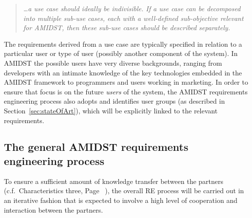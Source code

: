 \begin{quote}
\emph{  \ldots a use case should ideally be indivisible. If a use case can be decomposed into multiple
  sub-use cases, each with a well-defined sub-objective relevant for AMIDST, then these sub-use cases should be
  described separately.}
\end{quote}

The requirements derived from a use case are typically specified in relation to a particular user or type of user (possibly 
another
component of the system). In AMIDST the possible users have very diverse backgrounds, ranging from developers with an
intimate knowledge of the key technologies embedded in the AMIDST framework to programmers and users working in
marketing. In order to ensure that focus is on the future \emph{users} of the system, the AMIDST requirements
engineering process also adopts and identifies user groups (as described in Section~\ref{sec:stateOfArt}), which will be
explicitly linked to the relevant requirements.
%
%
%

\subsection{The general AMIDST requirements engineering process}
\label{sec:reprocess}

To ensure a sufficient amount of knowledge transfer between the partners (c.f.\ Characteristics three, Page~
\pageref{sec:characteristic3}),
the overall  RE process will be carried out in an iterative fashion that is expected to involve a
high level of cooperation and interaction between the partners.  

